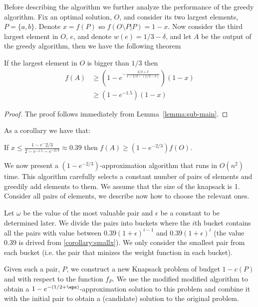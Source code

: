Before describing the algorithm we further analyze the performance of the greedy algorithm.
Fix an optimal solution, $O$, and consider its two largest elements, $P = \{a, b\}$.
Denote $x = f(P)$ so $f(O \setminus P | P) = 1 - x$.
Now consider the third largest element in $O$, $e$, and denote $w(e) = 1/3 - \delta$,
and let $A$ be the output of the greedy algorithm, then we have the following theorem

\begin{theorem}
If the largest element in $O$ is bigger than $1/3$ then 
\begin{align*}
f(A) 	& \geq (1-e^{-\frac{2/3 + \delta}{1 - 1/3 - (1/3 - \delta)}})(1 - x)
\\		& \geq (1 - e^{-1.5})(1 - x) 
\end{align*}
\end{theorem} 

\begin{proof}
The proof follows immediately from Lemma~\ref{lemma:sub-main}.
\end{proof}

As a corollary we have that:

\begin{corollary}
\label{corollary:smallx}
If $x \leq \frac{1 - e^-{2/3}}{2 - e^{-1.5} - e^{-2/3}} \approx 0.39$ 
then $f(A) \geq (1 - e^{-2/3})f(O)$.
\end{corollary}

We now present a $(1-e^{-2/3})$-approximation algorithm that runs in $O(n^2)$ time.
This algorithm carefully selects a constant number of pairs of elements and greedily 
add elements to them.
We assume that the size of the knapsack is 1.
Consider all pairs of elements, we describe now how to choose the relevant ones.

Let $\omega$ be the value of the most valuable pair and $\epsilon$ be a constant to 
be determined later.
We divide the pairs into buckets where the $i$th bucket contains all the pairs with value
between $0.39 (1 + \epsilon)^{i - 1}$ and $0.39 (1 + \epsilon)^{i}$ 
(the value 0.39 is drived from \ref{corollary:smallx}).
We only consider the smallest pair from each bucket 
(i.e. the pair that minizes the weight function in each bucket).  

Given such a pair, $P$, we construct a new Knapsack problem of budget $1 - c(P)$ and with 
respect to the function $f_P$.
We use the modified modified algorithm to obtain a $1-e^{-(1/2 + \eps)}$-approximation
solution to this problem and combine it with the initial pair to obtain a (candidate) 
solution to the original problem.

